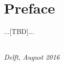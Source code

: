 \chapter*{Preface}


...[TBD]...

\begin{flushright}
{\makeatletter\itshape
    \@author \\
    Delft, August 2016
\makeatother}
\end{flushright}


